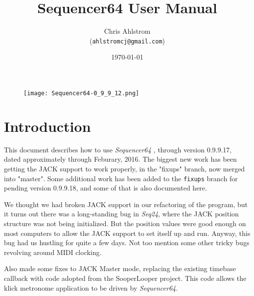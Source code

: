 \documentclass[
 11pt,
 twoside,
 a4paper,
 headinclude,
 footinclude,
 final                                 %
]{article}
\begin{document}
\title{Sequencer64 User Manual}
\author{Chris Ahlstrom \\
   (\texttt{ahlstromcj@gmail.com})}
\date{\today}
\maketitle

\begin{figure}[H]
   \centering 
   \texttt{[image: Sequencer64-0\_9\_9\_12.png]}
\end{figure}

\clearpage                             %

\tableofcontents
\listoffigures                         %
\listoftables                          %


\setlength{\parindent}{0pt}
\setlength{\parskip}{1ex plus 0.5ex minus 0.2ex}

\section{Introduction}
\label{sec:introduction}

   This document describes how to use \textsl{Sequencer64}
   \cite{sequencer64},
   through version 0.9.9.17, dated approximately through Feburary, 2016.
   The biggest new work has been getting the JACK support to work properly,
   in the "fixups" branch, now merged into "master".
   Some additional work has been added to the \texttt{fixups} branch for
   pending version 0.9.9.18, and some of that is also documented here.

   We thought we had broken JACK support in our refactoring of the program, but
   it turns out there was a long-standing bug in \textsl{Seq24}, where the JACK
   position structure was not being initialized.  But the position values were
   good enough on most computers to allow the JACK support to set itself up and
   run.  Anyway, this bug had us hustling for quite a few days.  Not too
   mention some other tricky bugs revolving around MIDI clocking.

   Also made some fixes to JACK Master mode, replacing the existing timebase
   callback with code adopted from the SooperLooper project.  This code
   allows the klick metronome application to be driven by
   \textsl{Sequencer64}.
\end{document}
